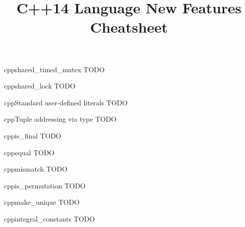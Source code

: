 \documentclass[10pt,a4paper]{article}
\title{\color{w3schools}C++14 Language New Features Cheatsheet
}
\begin{document}
\maketitle

\small
\begin{multicols}{3}

\thispagestyle{empty}
\scriptsize



\begin{codebox}{cpp}{shared\_timed\_mutex}
TODO

\end{codebox}

\begin{codebox}{cpp}{shared\_lock}
TODO

\end{codebox}

\begin{codebox}{cpp}{Standard user-defined literals}
TODO

\end{codebox}

\begin{codebox}{cpp}{Tuple addressing via type}
TODO

\end{codebox}

\begin{codebox}{cpp}{is\_final}
TODO

\end{codebox}

\begin{codebox}{cpp}{equal}
TODO

\end{codebox}

\begin{codebox}{cpp}{mismatch}
TODO

\end{codebox}

\begin{codebox}{cpp}{is\_permutation}
TODO

\end{codebox}

\begin{codebox}{cpp}{make\_unique}
TODO

\end{codebox}

\begin{codebox}{cpp}{integral\_constants}
TODO

\end{codebox}


\end{multicols}
\end{document}
